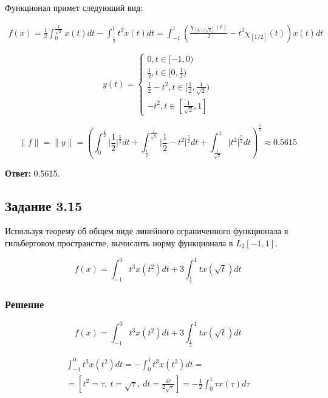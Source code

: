 \documentclass[a4paper, 12pt]{report}
\begin{document}
  Функционал примет следующий вид:

  \begin{multline*}
    f(x) = \frac{1}{2} \int_{0}^{\frac{1}{\sqrt{2}}} x(t) dt - 
    \int_{\frac{1}{2}}^{1} t^2 x(t) dt = 
    \int_{ - 1}^{1} \left( \frac{\chi_{[0, 1 / \sqrt{2}]}(t)}{2} - 
    t^2 \chi_{[1 / 2]}(t)\right) x(t) dt
  \end{multline*}


  \begin{equation*}
    y(t) = 
    \begin{cases}
      0, t \in [ - 1, 0)\\
      \frac{1}{2}, t \in [0, \frac{1}{2})\\
      \frac{1}{2} - t^2, t \in [\frac{1}{2}, \frac{1}{\sqrt{2}})\\
      - t^2, t \in [\frac{1}{\sqrt{2}}, 1]
    \end{cases}
  \end{equation*}

  \[\| f \| = \| y \| = \left( \int_{ 0}^{\frac{1}{2}} \Big| \frac{1}{2} \Big|^{\frac{5}{2}}dt +
  \int_{\frac{1}{2}}^{\frac{1}{\sqrt{2}}} \Big| \frac{1}{2} - t^2 \Big|^{\frac{5}{2}}dt +
  \int_{\frac{1}{\sqrt{2}}}^{1} \Big| t^2 \Big|^{\frac{5}{2}} dt \right)^{\frac{2}{5}} 
  \approx 0.5615\]

  \textbf{Ответ:} 0.5615.

\newpage
\subsection*{Задание 3.15}

Используя теорему об общем виде линейного ограниченного функционала в гильбертовом
пространстве, вычислить норму функционала в $L_2[-1, 1]$.

\[f(x) = \int_{ - 1}^{0} t^3 x(t^2) dt + 
3 \int_{\frac{1}{2}}^{1} tx (\sqrt{t}) dt\]

\subsubsection*{Решение}

\[f(x) = \int_{ - 1}^{0} t^3 x(t^2) dt + 
3 \int_{\frac{1}{2}}^{1} tx (\sqrt{t}) dt\]

\begin{multline*}
\int_{ -1}^0t^3 x(t^2)dt = - \int_0^1 t^3 x(t^2)dt = \\=
\left[ t^2 = \tau,\ t = \sqrt{\tau},\ dt = \frac{d \tau}{2 \sqrt{\tau}} \right] =
- \frac{1}{2}\int_{0}^{1}\tau x(\tau) d \tau
\end{multline*}
\end{document}
